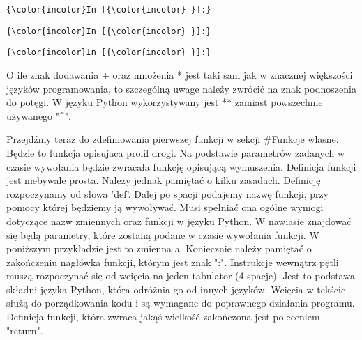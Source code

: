 \documentclass[11pt]{article}
\begin{document}
    \begin{Verbatim}[commandchars=\\\{\}]
{\color{incolor}In [{\color{incolor} }]:} 
\end{Verbatim}

    \begin{Verbatim}[commandchars=\\\{\}]
{\color{incolor}In [{\color{incolor} }]:} 
\end{Verbatim}

    \begin{Verbatim}[commandchars=\\\{\}]
{\color{incolor}In [{\color{incolor} }]:} 
\end{Verbatim}

    O ile znak dodawania + oraz mnożenia * jest taki sam jak w znacznej
większości języków programowania, to szczególną uwage należy zwrócić na
znak podnoszenia do potęgi. W języku Python wykorzystywany jest **
zamiast powszechnie używanego "\^{}".

    Przejdźmy teraz do zdefiniowania pierwszej funkcji w sekcji \#Funkcje
wlasne. Będzie to funkcja opisujaca profil drogi. Na podstawie
parametrów zadanych w czasie wywołania będzie zwracała funkcję opisującą
wymuszenia. Definicja funkcji jest niebywale prosta. Należy jednak
pamiętać o kilku zasadach. Definicję rozpoczynamy od słowa 'def'. Dalej
po spacji podajemy nazwę funkcji, przy pomocy której będziemy ją
wywoływać. Musi spełniać ona ogólne wymogi dotyczące nazw zmiennych oraz
funkcji w języku Python. W nawiasie znajdować się będą parametry, które
zostaną podane w czasie wywołania funkcji. W poniższym przykładzie jest
to zmienna a. Koniecznie należy pamiętać o zakończeniu nagłówka funkcji,
którym jest znak ":". Instrukcje wewnątrz pętli muszą rozpoczynać się od
wcięcia na jeden tabulator (4 spacje). Jest to podstawa składni języka
Python, która odróżnia go od innych języków. Wcięcia w tekście służą do
porządkowania kodu i są wymagane do poprawnego działania programu.
Definicja funkcji, która zwraca jakąś wielkość zakończona jest
poleceniem "return".
\end{document}
